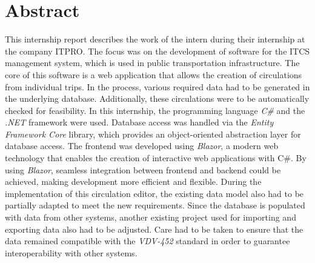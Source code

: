 \chapter{Abstract}
    This internship report describes the work of the intern during their internship at the company ITPRO. The focus was on the development
    of software for the ITCS management system, which is used in public transportation infrastructure. The core of this software is a web application
    that allows the creation of circulations from individual trips. In the process, various required data had to be generated in the underlying database.
    Additionally, these circulations were to be automatically checked for feasibility.
    In this internship, the programming language \emph{C\#} and the \emph{.NET} framework were used. Database access was handled via the \emph{Entity Framework Core} library,
    which provides an object-oriented abstraction layer for database access. The frontend was developed using \emph{Blazor}, a modern web technology
    that enables the creation of interactive web applications with C\#. By using \emph{Blazor}, seamless integration between frontend and backend could be achieved,
    making development more efficient and flexible.
    During the implementation of this circulation editor, the existing data model also had to be partially adapted to meet the new requirements.
    Since the database is populated with data from other systems, another existing project used for importing and exporting data also had to be adjusted.
    Care had to be taken to ensure that the data remained compatible with the \emph{VDV-452} standard in order to guarantee interoperability with other systems.